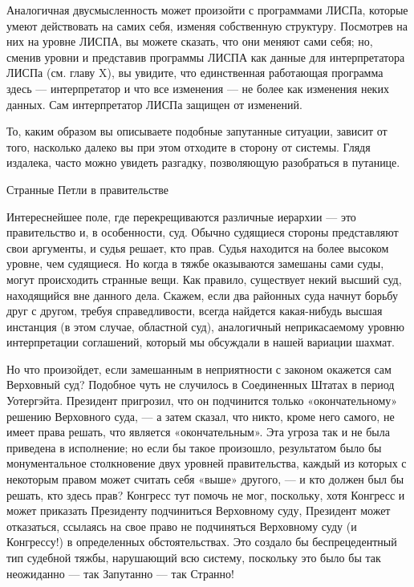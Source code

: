 Аналогичная двусмысленность может произойти с программами ЛИСПа, которые умеют действовать на самих себя, изменяя собственную структуру. Посмотрев на них на уровне ЛИСПА, вы можете сказать, что они меняют сами себя; но, сменив уровни и представив программы ЛИСПА как данные для интерпретатора ЛИСПа (см. главу X), вы увидите, что единственная работающая программа здесь --- интерпретатор и что все изменения --- не более как изменения неких данных. Сам интерпретатор ЛИСПа защищен от изменений.

То, каким образом вы описываете подобные запутанные ситуации, зависит от того, насколько далеко вы при этом отходите в сторону от системы. Глядя издалека, часто можно увидеть разгадку, позволяющую разобраться в путанице.

Странные Петли в правительстве

Интереснейшее поле, где перекрещиваются различные иерархии --- это правительство и, в особенности, суд. Обычно судящиеся стороны представляют свои аргументы, и судья решает, кто прав. Судья находится на более высоком уровне, чем судящиеся. Но когда в тяжбе оказываются замешаны сами суды, могут происходить странные вещи. Как правило, существует некий высший суд, находящийся вне данного дела. Скажем, если два районных суда начнут борьбу друг с другом, требуя справедливости, всегда найдется какая-нибудь высшая инстанция (в этом случае, областной суд), аналогичный неприкасаемому уровню интерпретации соглашений, который мы обсуждали в нашей вариации шахмат.

Но что произойдет, если замешанным в неприятности с законом окажется сам Верховный суд? Подобное чуть не случилось в Соединенных Штатах в период Уотергэйта. Президент пригрозил, что он подчинится только «окончательному» решению Верховного суда, --- а затем сказал, что никто, кроме него самого, не имеет права решать, что является «окончательным». Эта угроза так и не была приведена в исполнение; но если бы такое произошло, результатом было бы монументальное столкновение двух уровней правительства, каждый из которых с некоторым правом может считать себя «выше» другого, --- и кто должен был бы решать, кто здесь прав? Конгресс тут помочь не мог, поскольку, хотя Конгресс и может приказать Президенту подчиниться Верховному суду, Президент может отказаться, ссылаясь на свое право не подчиняться Верховному суду (и Конгрессу!) в определенных обстоятельствах. Это создало бы беспрецедентный тип судебной тяжбы, нарушающий всю систему, поскольку это было бы так неожиданно --- так Запутанно --- так Странно!


